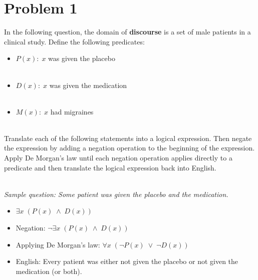 \documentclass{amsart}
\theoremstyle{definition}
\theoremstyle{Exercise}
\theoremstyle{remark}
\theoremstyle{rule}
\numberwithin{equation}{section}
\begin{document}
\section*{Problem 1}

In the following question, the domain of {\bf discourse} is a set of male patients in a clinical study. Define the following predicates:\\
\begin{itemize}
  \item $P(x):\; x$ was given the placebo\\\\
  \item $D(x):\; x$ was given the medication\\\\
  \item $M(x): \; x$ had migraines\\\\
\end{itemize}
Translate each of the following statements into a logical expression. Then negate the expression by adding a negation operation to the beginning of the expression. Apply De Morgan's law until each negation operation applies directly to a predicate and then translate the logical expression back into English.\\\\

{\it
Sample question: Some patient was given the placebo and the medication.\\
\begin{itemize}
  \item $\exists x\; (P(x)\; \land \; D(x))$\\
  \item Negation: $\neg \exists x\; (P(x)\; \land \; D(x))$\\
  \item Applying De Morgan's law: $\forall x\; (\neg P(x)\; \lor \; \neg D(x))$\\
  \item English: Every patient was either not given the placebo or not given the medication (or both).\\
\end{itemize}
}
\newpage
\end{document}
